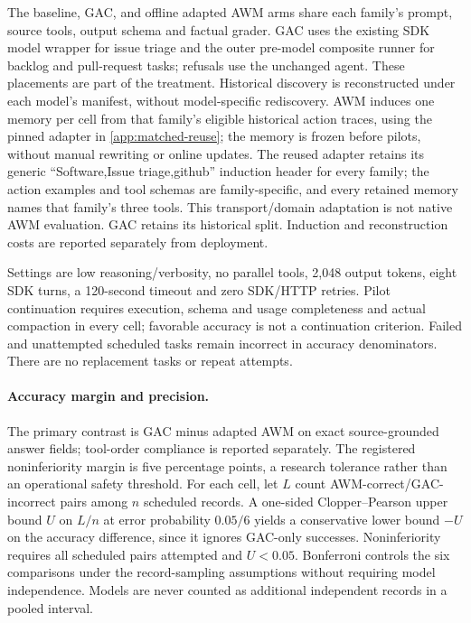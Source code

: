 The baseline, GAC, and offline adapted AWM arms share each family's prompt,
source tools, output schema and factual grader. GAC uses the existing SDK model
wrapper for issue triage and the outer pre-model composite runner for backlog
and pull-request tasks; refusals use the unchanged agent. These placements are
part of the treatment. Historical discovery is reconstructed under each model's
manifest, without model-specific rediscovery. AWM induces one memory per cell
from that family's eligible historical action traces, using the pinned adapter
in \cref{app:matched-reuse}; the memory is frozen before pilots, without manual
rewriting or online updates. The reused adapter retains its generic
``Software,Issue triage,github'' induction header for every family; the
action examples and tool schemas are family-specific, and every retained
memory names that family's three tools. This transport/domain adaptation is
not native AWM evaluation. GAC retains its historical split. Induction and
reconstruction costs are reported separately from deployment.

Settings are low reasoning/verbosity, no parallel tools, 2,048 output tokens,
eight SDK turns, a 120-second timeout and zero SDK/HTTP retries. Pilot continuation
requires execution, schema and usage completeness and actual compaction in
every cell; favorable accuracy is not a continuation criterion. Failed and
unattempted scheduled tasks remain incorrect in accuracy denominators. There
are no replacement tasks or repeat attempts.

\paragraph{Accuracy margin and precision.}
The primary contrast is GAC minus adapted AWM on exact source-grounded answer
fields; tool-order compliance is reported separately. The registered
noninferiority margin is five percentage points, a research tolerance rather
than an operational safety threshold. For each cell, let $L$ count
AWM-correct/GAC-incorrect pairs among $n$ scheduled records. A one-sided
Clopper--Pearson upper bound $U$ on $L/n$ at error probability $0.05/6$ yields
a conservative lower bound $-U$ on the accuracy difference, since it ignores
GAC-only successes. Noninferiority requires all scheduled pairs attempted and
$U<0.05$. Bonferroni controls the six comparisons under the record-sampling
assumptions without requiring model independence. Models are never counted as
additional independent records in a pooled interval.


